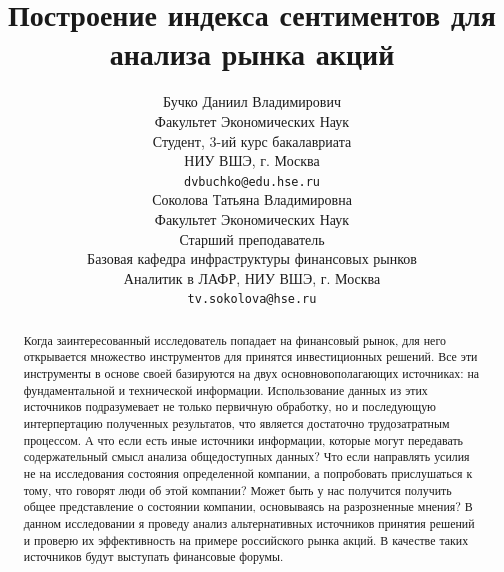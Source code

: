 \documentclass{article}
\title{Построение индекса сентиментов для анализа рынка акций}
\author{
  Бучко Даниил Владимирович \\
  Факультет Экономических Наук\\
  Студент, 3-ий курс бакалавриата \\
  НИУ ВШЭ, г. Москва\\
  \texttt{dvbuchko@edu.hse.ru} \\
   \And
 Соколова Татьяна Владимировна \\
  Факультет Экономических Наук \\
  Старший преподаватель \\
  Базовая кафедра инфраструктуры финансовых рынков \\
  Аналитик в ЛАФР, НИУ ВШЭ, г. Москва \\
  \texttt{tv.sokolova@hse.ru} \\
}
\begin{document}
\maketitle

\begin{abstract}

Когда заинтересованный исследователь попадает на финансовый рынок, для него открывается множество инструментов для принятся инвестиционных решений. Все эти инструменты в основе своей базируются на двух основновополагающих источниках: на фундаментальной и технической информации. Использование данных из этих источников подразумевает не только первичную обработку, но и последующую интерпертацию полученных результатов, что является достаточно трудозатратным процессом. А что если есть иные источники информации, которые могут передавать содержательный смысл анализа общедоступных данных? Что если направлять усилия не на исследования состояния определенной компании, а попробовать прислушаться к тому, что говорят люди об этой компании? Может быть у нас получится получить общее представление о состоянии компании, основываясь на разрозненные мнения? В данном исследовании я проведу анализ альтернативных источников принятия решений и проверю их эффективность на примере российского рынка акций. В качестве таких источников будут выступать финансовые форумы.


\end{abstract}


\end{document}
